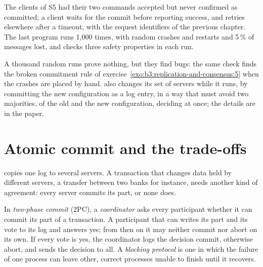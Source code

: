 \label{out:b3:replication-and-consensus:partition}

The clients of S5 had their two commands accepted but never confirmed as committed; a client waits for the commit before reporting success, and retries elsewhere after a timeout, with the request identifiers of the previous chapter. The last program runs  1,000 times, with random crashes and restarts and 5\,\% of messages lost, and checks three safety properties in each run.

\label{out:b3:replication-and-consensus:check}

A thousand random runs prove nothing, but they find bugs: the same check finds the broken commitment rule of exercise~\ref{exo:b3:replication-and-consensus:5} when the crashes are placed by hand.  also changes its set of servers while it runs, by committing the new configuration as a log entry, in a way that must avoid two majorities, of the old and the new configuration, deciding at once; the details are in the  paper.

\section{Atomic commit and the trade-offs}\label{sec:b3:replication-and-consensus:commit}

 copies one log to several servers. A transaction that changes data held by different servers, a transfer between two banks for instance, needs another kind of agreement: every server commits its part, or none does.

\begin{definition}\label{def:b3:replication-and-consensus:2pc}
In \emph{two-phase commit} (2PC), a \emph{coordinator} asks every participant whether it can commit its part of a transaction. A participant that can writes its part and its vote to its log and answers yes; from then on it may neither commit nor abort on its own. If every vote is yes, the coordinator logs the decision commit, otherwise abort, and sends the decision to all. A \emph{blocking protocol} is one in which the failure of one process can leave other, correct processes unable to finish until it recovers.
\end{definition}

